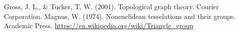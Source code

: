\documentclass{article}
\begin{document}
\newpage
\begin{thebibliography}{99}

    Gross, J. L., \& Tucker, T. W. (2001). Topological graph theory. Courier Corporation.
    Magnus, W. (1974). Noneuclidean tesselations and their groups. Academic Press.
    \url{https://en.wikipedia.org/wiki/Triangle\_group}
\end{thebibliography}
\end{document}
